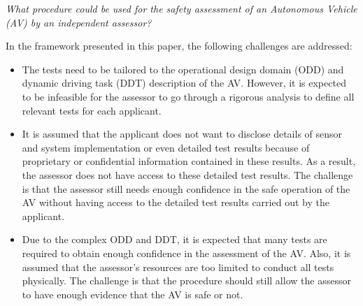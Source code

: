 \emph{What procedure could be used for the safety assessment of an Autonomous Vehicle (AV) by an independent assessor?}

In the framework presented in this paper, the following challenges are addressed:
\begin{itemize}
	\item The tests need to be tailored to the operational design domain (ODD) and dynamic driving task (DDT) description of the AV. However, it is expected to be infeasible for the assessor to go through a rigorous analysis to define all relevant tests for each applicant.
	\item It is assumed that the applicant does not want to disclose details of sensor and system implementation or even detailed test results because of proprietary or confidential information contained in these results. As a result, the assessor does not have access to these detailed test results. The challenge is that the assessor still needs enough confidence in the safe operation of the AV without having access to the detailed test results carried out by the applicant.
	\item Due to the complex ODD and DDT, it is expected that many tests are required to obtain enough confidence in the assessment of the AV. Also, it is assumed that the assessor's resources are too limited to conduct all tests physically. The challenge is that the procedure should still allow the assessor to have enough evidence that the AV is safe or not.
\end{itemize}
